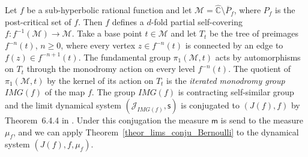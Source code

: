 \documentclass[12pt]{article}
\newcommand{\Rs}{\hat{\mathbb{C}}}
\newcommand{\M}{\mathcal{M}}
\newcommand{\lims}[1][G]{\mathscr{J}_{#1}}
\newcommand{\si}{\mathsf{s}}
\newcommand{\muls}{\mathsf{m}}
\theoremstyle{definition}
\begin{document}
Let $f$ be a sub-hyperbolic rational function and let $\M=\Rs\setminus\overline{P}_f$, where $P_f$
is the post-critical set of $f$. Then $f$ defines a $d$-fold partial self-covering $f:
f^{-1}(\M)\rightarrow\M$. Take a base point $t\in\M$ and let $T_t$ be the tree of preimages
$f^{-n}(t)$, $n\geq 0$, where every vertex $z\in f^{-n}(t)$ is connected by an edge to $f(z)\in
f^{-n+1}(t)$. The fundamental group $\pi_1(\M,t)$ acts by automorphisms on $T_t$ through the
monodromy action on every level $f^{-n}(t)$. The quotient of $\pi_1(\M,t)$ by the kernel of its
action on $T_t$ is the \textit{iterated monodromy group} $IMG(f)$ of the map $f$. The group
$IMG(f)$ is contracting self-similar group and the limit dynamical system $(\lims[IMG(f)],\si)$ is
conjugated to $(J(f),f)$ by Theorem~6.4.4 in \cite{self_sim_groups}. Under this conjugation the
measure $\muls$ is send to the measure $\mu_f$, and we can apply
Theorem~\ref{theor_lims_conju_Bernoulli} to the dynamical system $(J(f),f,\mu_f)$.




\end{document}
